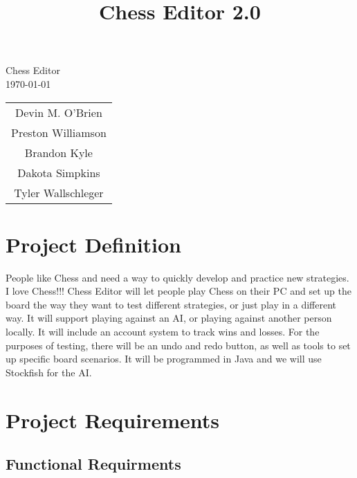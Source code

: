 \documentclass{article}
\title{Chess Editor 2.0}
\begin{document}
\begin{titlepage}
\begin{center}
\vspace{1cm}
\huge Chess Editor\\
\normalsize
\vspace{1cm}
\today\\
\vspace{1cm}
\begin{tabular}{c}
Devin M. O'Brien \\
Preston Williamson\\
Brandon Kyle\\
Dakota Simpkins\\
Tyler Wallschleger
\end{tabular}
\end{center}
\end{titlepage}
\section{Project Definition}
People like Chess and need a way to quickly develop and practice new strategies. I love
Chess!!! Chess Editor will let people play Chess on their PC and set up the board the
way they want to test different strategies, or just play in a different way. It will support
playing against an AI, or playing against another person locally. It will include an account
system to track wins and losses. For the purposes of testing, there will be an undo and
redo button, as well as tools to set up specific board scenarios. It will be programmed in
Java and we will use Stockfish for the AI.
\newpage
\section{Project Requirements}

\subsection{Functional Requirments}
\end{document}
